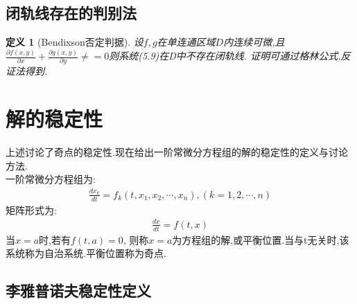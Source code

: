 \documentclass[12pt, a4paper, oneside]{ctexbook}
\newtheorem{definition}[theorem]{定义}
\begin{document}
        \subsection{闭轨线存在的判别法}
        \begin{definition}[Bendixson否定判据]
            设$f,g$在单连通区域$D$内连续可微,且$\frac{\partial f(x,y)}{\partial x}+\frac{\partial g(x,y)}{\partial y}\neq =0$则系统(5.9)在D中不存在闭轨线.
            证明可通过格林公式,反证法得到.
        \end{definition}
    \section{解的稳定性}
    上述讨论了奇点的稳定性.现在给出一阶常微分方程组的解的稳定性的定义与讨论方法.\\
    一阶常微分方程组为:
    \begin{align}
        \frac{dx_k}{dt}=f_k(t,x_1,x_2,\cdots,x_n),(k=1,2,\cdots,n)
    \end{align}
    矩阵形式为:
    \begin{align}
        \frac{d\mathbf{\mathit{x}}}{dt}={\mathbf{\mathit{f}}}(t,{\mathbf{\mathit{x}}})
    \end{align}
    当${\mathbf{\mathit{x}}}={\mathbf{\mathit{a}}}$时,若有${\mathbf{\mathit{f}}}( t,{\mathbf{\mathit{a}}})={\mathbf{\mathit{0}}}$,
    则称${\mathbf{\mathit{x}}}={\mathbf{\mathit{a}}}$为方程组的解,或平衡位置.当{}与t无关时,该系统称为自治系统.平衡位置称为奇点.
    \subsection{李雅普诺夫稳定性定义}
\end{document}
